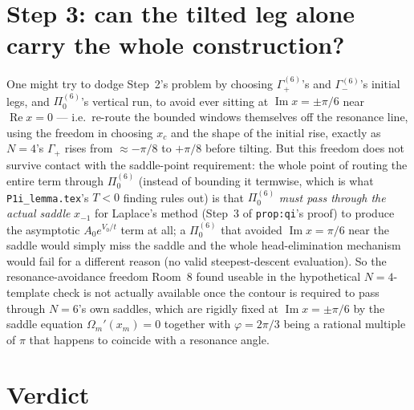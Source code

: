 \documentclass[11pt]{article}
\begin{document}
\section*{Step 3: can the tilted leg alone carry the whole construction?}

One might try to dodge Step~2's problem by choosing $\Gamma_+^{(6)}$'s and $\Gamma_-^{(6)}$'s initial
legs, and $\Pi_0^{(6)}$'s vertical run, to avoid ever sitting at $\operatorname{Im}x=\pm\pi/6$ near
$\operatorname{Re}x=0$ --- i.e.\ re-route the bounded windows themselves off the resonance line,
using the freedom in choosing $x_c$ and the shape of the initial rise, exactly as $N=4$'s $\Gamma_+$
rises from $\approx-\pi/8$ to $+\pi/8$ before tilting. But this freedom does not survive contact with
the saddle-point requirement: the whole point of routing the entire term through $\Pi_0^{(6)}$
(instead of bounding it termwise, which is what \texttt{P1i\_lemma.tex}'s $T<0$ finding rules out) is
that $\Pi_0^{(6)}$ \emph{must pass through the actual saddle} $x_{-1}$ for Laplace's method (Step~3 of
\texttt{prop:qi}'s proof) to produce the asymptotic $A_0e^{V_0/t}$ term at all; a $\Pi_0^{(6)}$ that
avoided $\operatorname{Im}x=\pi/6$ near the saddle would simply miss the saddle and the whole
head-elimination mechanism would fail for a different reason (no valid steepest-descent evaluation).
So the resonance-avoidance freedom Room~8 found useable in the hypothetical $N=4$-template check is
not actually available once the contour is required to pass through $N=6$'s own saddles, which are
rigidly fixed at $\operatorname{Im}x=\pm\pi/6$ by the saddle equation $\Omega_m'(x_m)=0$ together with
$\varphi=2\pi/3$ being a rational multiple of $\pi$ that happens to coincide with a resonance angle.

\section*{Verdict}
\end{document}
